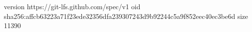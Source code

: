 version https://git-lfs.github.com/spec/v1
oid sha256:affcb63223a71f23ede32356dfa239307243d9b92244c5a9f852eec40ec3be6d
size 11390
